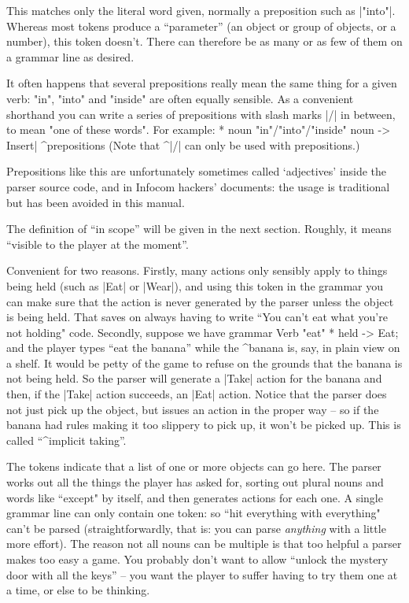 \bigskip\noindent{}\qquad
This matches only the literal word given, normally a preposition such
as |"into"|.  Whereas most tokens produce a ``parameter'' (an object
or group of objects, or a number), this token doesn't.  There can therefore
be as many or as few of them on a grammar line as desired.

It often happens that several prepositions really mean
the same thing for a given verb: "in", "into" and "inside"
are often equally sensible.  As a convenient shorthand
you can write a series of prepositions with slash marks |/|
in between, to mean "one of these words".  For example:
\beginstt
     * noun "in"/"into"/"inside" noun      -> Insert|
\endtt^{prepositions}
(Note that ^|/| can only be used with prepositions.)

\danger Prepositions like this are unfortunately sometimes called `adjectives'
inside the parser source code, and in Infocom hackers' documents: the usage
is traditional but has been avoided in this manual.

\bigskip\noindent{}\qquad
The definition of ``in scope'' will be given in the next section.  Roughly,
it means ``visible to the player at the moment''.

\bigskip\noindent{}\qquad
Convenient for two reasons.  Firstly, many actions
only sensibly apply to things being held (such as |Eat| or |Wear|), and
using this token in the grammar you can make sure that the action is
never generated by the parser unless the object is being held.  That
saves on always having to write ``You can't eat what you're not holding"
code.  Secondly, suppose we have grammar
\beginstt
Verb "eat"
                * held                           -> Eat;
\endtt
and the player types ``eat the banana''
while the ^{banana} is, say, in plain view on a shelf.  It would be
petty of the game to refuse on the grounds that the banana is
not being held.  So the parser will generate a |Take| action for the
banana and then, if the |Take| action succeeds, an |Eat| action.  Notice
that the parser does not just pick up the object, but issues an action
in the proper way -- so if the banana had rules making it too slippery
to pick up, it won't be picked up.  This is called ``^{implicit taking}''.

\bigskip\noindent
The  tokens indicate that a list of one or more objects can
go here.  The parser works out all the things the player has asked
for, sorting out plural nouns and words like ``except" by itself, and
then generates actions for each one.  A single grammar line can only
contain one  token: so ``hit everything with everything"
can't be parsed (straightforwardly, that is: you can parse {\sl anything}
with a little more effort).  The reason not all nouns can be multiple
is that too helpful a parser makes too easy a game.  You probably don't
want to allow ``unlock the mystery door with all the keys''
-- you want the player to suffer having to try them one at a time,
or else to be thinking.

